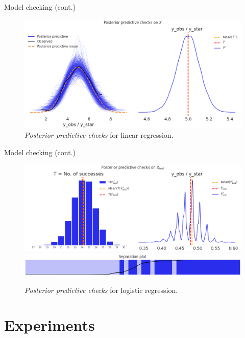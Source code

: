 \documentclass[10pt, english, professionalfonts]{beamer}
\begin{document}
\begin{frame}{Model checking (cont.)}
  \begin{figure}
    \includegraphics[width=\textwidth]{img/ppc_linear}
    \caption{\textit{Posterior predictive checks} for linear regression.}
  \end{figure}
\end{frame}

\begin{frame}{Model checking (cont.)}
  \begin{figure}
    \includegraphics[width=\textwidth]{img/ppc_logistic1}
    \includegraphics[width=\textwidth]{img/ppc_logistic2}
    \caption{\textit{Posterior predictive checks} for logistic regression.}
  \end{figure}
\end{frame}

\section{Experiments}
\end{document}
